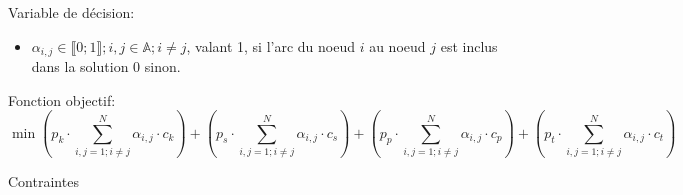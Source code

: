 Variable de décision:
\begin{itemize}
  \item $\alpha_{i,j} \in \llbracket 0;1 \rrbracket; i,j \in \mathbb{A} ;i \neq j $, valant 1, si l'arc du noeud $i$ au noeud $j$ est inclus dans la solution 0 sinon.
\end{itemize}

Fonction objectif:
\begin{equation}
  \min (p_k \cdot \sum_{i,j=1;i \neq j}^{N}\alpha_{i,j} \cdot c_k)+(p_s \cdot \sum_{i,j=1;i \neq j}^{N}\alpha_{i,j} \cdot c_s)+(p_p \cdot \sum_{i,j=1;i \neq j}^{N}\alpha_{i,j} \cdot c_p)+(p_t \cdot \sum_{i,j=1;i \neq j}^{N}\alpha_{i,j} \cdot c_t)
\end{equation}

Contraintes
